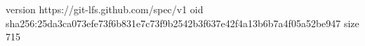 version https://git-lfs.github.com/spec/v1
oid sha256:25da3ca073efe73f6b831e7c73f9b2542b3f637e42f4a13b6b7a4f05a52be947
size 715
